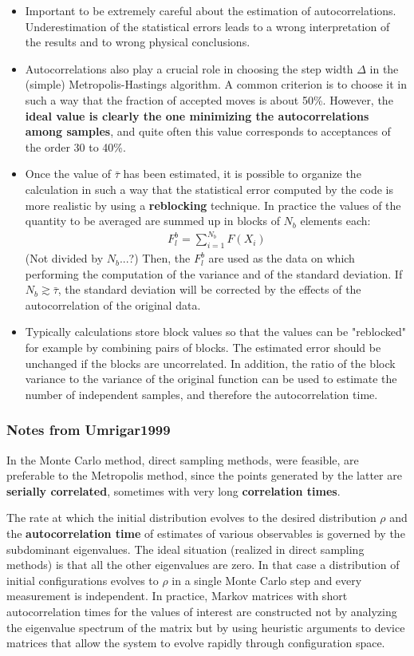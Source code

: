 \documentclass[twoside,english]{uiofysmaster}
\begin{document}
\begin{itemize}
	\item Important to be extremely careful about the estimation of autocorrelations. Underestimation of the statistical errors leads to a wrong interpretation of the results and to wrong physical conclusions.
	\item Autocorrelations also play a crucial role in choosing the step width $\Delta$ in the (simple) Metropolis-Hastings algorithm. A common criterion is to choose it in such a way that the fraction of accepted moves is about 50\%. However, the \textbf{ideal value is clearly the one minimizing the autocorrelations among samples}, and quite often this value corresponds to acceptances of the order 30 to 40\%. 
	\item Once the value of $\bar{\tau}$ has been estimated, it is possible to organize the calculation in such a way that the statistical error computed by the code is more realistic by using a \textbf{reblocking} technique. In practice the values of the quantity to be averaged are summed up in blocks of $N_b$ elements each:
	\begin{align}
		F_l^b = \sum_{i=1}^{N_b} F(X_i)
	\end{align}
	(Not divided by $N_b$...?) Then, the $F_l^b$ are used as the data on which performing the computation of the variance and of the standard deviation. If $N_b \gtrsim \bar{\tau}$, the standard deviation will be corrected by the effects of the autocorrelation of the original data. 
	\item Typically calculations store block values so that the values can be "reblocked" for example by combining pairs of blocks. The estimated error should be unchanged if the blocks are uncorrelated. In addition, the ratio of the block variance to the variance of the original function can be used to estimate the number of independent samples, and therefore the autocorrelation time.
\end{itemize}
\cite{HjortJensen2017}

\subsubsection{Notes from Umrigar1999}
In the Monte Carlo method, direct sampling methods, were feasible, are preferable to the Metropolis method, since the points generated by the latter are \textbf{serially correlated}, sometimes with very long \textbf{correlation times}. 

The rate at which the initial distribution evolves to the desired distribution $\rho$ and the \textbf{autocorrelation time} of estimates of various observables is governed by the subdominant eigenvalues. The ideal situation (realized in direct sampling methods) is that all the other eigenvalues are zero. In that case a distribution of initial configurations evolves to $\rho$ in a single Monte Carlo step and every measurement is independent. In practice, Markov matrices with short autocorrelation times for the values of interest are constructed not by analyzing the eigenvalue spectrum of the matrix but by using heuristic arguments to device matrices that allow the system to evolve rapidly through configuration space.
\end{document}
